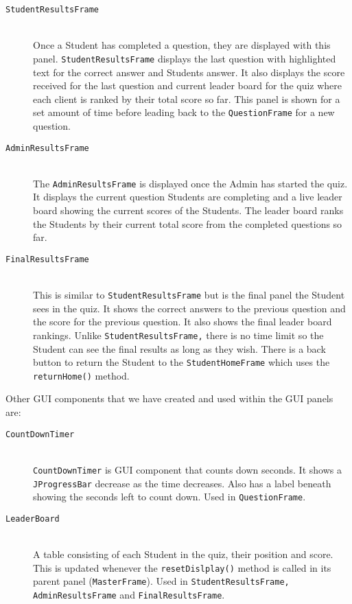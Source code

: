 \begin{enumerate}
\begin{description}
		\item[\texttt{StudentResultsFrame}]\hfill \\ Once a Student has
			completed a question, they are displayed with this panel.
			\texttt{StudentResultsFrame} displays the last question with
			highlighted text for the correct answer and Students answer. It
			also displays the score received for the last question and current
			leader board for the quiz where each client is ranked by their
			total score so far. This panel is shown for a set amount of time
			before leading back to the \texttt{QuestionFrame} for a new
			question.

		\item[\texttt{AdminResultsFrame}]\hfill \\ The
			\texttt{AdminResultsFrame} is displayed once the Admin has started
			the quiz. It displays the current question Students are completing
			and a live leader board showing the current scores of the Students.
			The leader board ranks the Students by their current total score
			from the completed questions so far.

		\item[\texttt{FinalResultsFrame}]\hfill \\ This is similar to
			\texttt{StudentResultsFrame} but is the final panel the Student
			sees in the quiz. It shows the correct answers to the previous
			question and the score for the previous question. It also shows the
			final leader board rankings. Unlike \texttt{StudentResultsFrame,}
			there is no time limit so the Student can see the final results as
			long as they wish. There is a back button to return the Student to
			the \texttt{StudentHomeFrame} which uses the \verb+returnHome()+
			method.

	\end{description}

	Other GUI components that we have created and used within the GUI panels
	are:

	\begin{description}

		\item[\texttt{CountDownTimer}]\hfill \\ \texttt{CountDownTimer} is GUI
			component that counts down seconds. It shows a
			\texttt{JProgressBar} decrease as the time decreases. Also has a
			label beneath showing the seconds left to count down. Used in
			\texttt{QuestionFrame}.

		\item[\texttt{LeaderBoard}]\hfill \\ A table consisting of each Student
			in the quiz, their position and score. This is updated whenever the
			\verb+resetDislplay()+ method is called in its parent panel
			(\texttt{MasterFrame}). Used in \texttt{StudentResultsFrame,}
			\texttt{AdminResultsFrame} and \texttt{FinalResultsFrame}.

	\end{description}

\end{enumerate}
